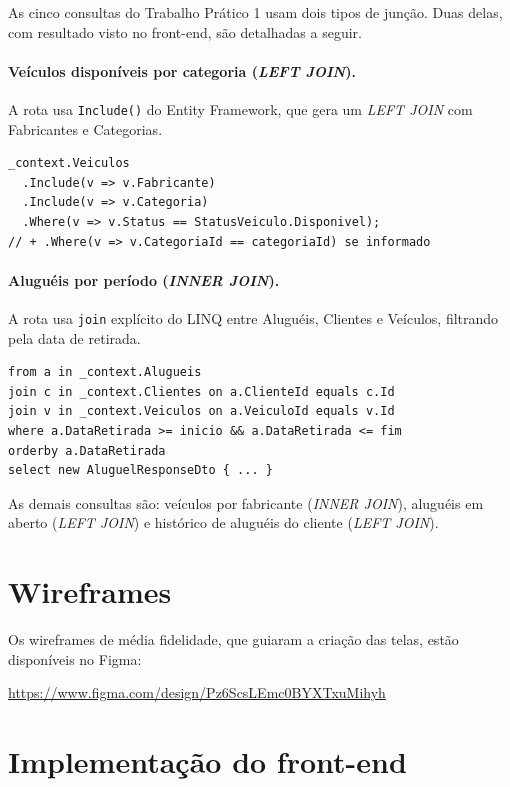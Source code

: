\documentclass[12pt]{article}
\begin{document}
As cinco consultas do Trabalho Prático 1 usam dois tipos de junção. Duas delas, com resultado visto no front-end, são detalhadas a seguir.

\paragraph{Veículos disponíveis por categoria (\textit{LEFT JOIN}).} A rota usa \texttt{Include()} do Entity Framework, que gera um \textit{LEFT JOIN} com Fabricantes e Categorias.

\begin{lstlisting}[language={[Sharp]C}]
_context.Veiculos
  .Include(v => v.Fabricante)
  .Include(v => v.Categoria)
  .Where(v => v.Status == StatusVeiculo.Disponivel);
// + .Where(v => v.CategoriaId == categoriaId) se informado
\end{lstlisting}

\paragraph{Aluguéis por período (\textit{INNER JOIN}).} A rota usa \texttt{join} explícito do LINQ entre Aluguéis, Clientes e Veículos, filtrando pela data de retirada.

\begin{lstlisting}[language={[Sharp]C}]
from a in _context.Alugueis
join c in _context.Clientes on a.ClienteId equals c.Id
join v in _context.Veiculos on a.VeiculoId equals v.Id
where a.DataRetirada >= inicio && a.DataRetirada <= fim
orderby a.DataRetirada
select new AluguelResponseDto { ... }
\end{lstlisting}

As demais consultas são: veículos por fabricante (\textit{INNER JOIN}), aluguéis em aberto (\textit{LEFT JOIN}) e histórico de aluguéis do cliente (\textit{LEFT JOIN}).

\section{Wireframes}

Os wireframes de média fidelidade, que guiaram a criação das telas, estão disponíveis no Figma:

\begin{center}
\url{https://www.figma.com/design/Pz6ScsLEmc0BYXTxuMihyh}
\end{center}

\section{Implementação do front-end}
\end{document}
